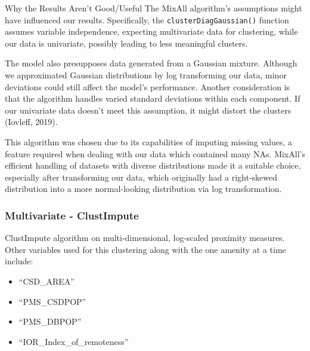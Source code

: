 \documentclass[11pt, a4paper]{article}
\begin{document}
Why the Results Aren't Good/Useful
The MixAll algorithm's assumptions might have influenced our results. Specifically, the \texttt{clusterDiagGaussian()} function assumes variable independence, expecting multivariate data for clustering, while our data is univariate, possibly leading to less meaningful clusters.
\par
The model also presupposes data generated from a Gaussian mixture. Although we approximated Gaussian distributions by log transforming our data, minor deviations could still affect the model's performance. Another consideration is that the algorithm handles varied standard deviations within each component. If our univariate data doesn't meet this assumption, it might distort the clusters (Iovleff, 2019).
\par
This algorithm was chosen due to its capabilities of imputing missing values, a feature required when dealing with our data which contained many NAs. MixAll's efficient handling of datasets with diverse distributions made it a suitable choice, especially after transforming our data, which originally had a right-skewed distribution into a more normal-looking distribution via log transformation.







\subsubsection{Multivariate - ClustImpute}

ClustImpute algorithm on multi-dimensional, log-scaled proximity measures. Other variables used for this clustering along with the one amenity at a time include:
\begin{itemize}
\item ``CSD\_AREA''
\item ``PMS\_CSDPOP''
\item ``PMS\_DBPOP''
\item ``IOR\_Index\_of\_remoteness''
\end{itemize}
\end{document}
